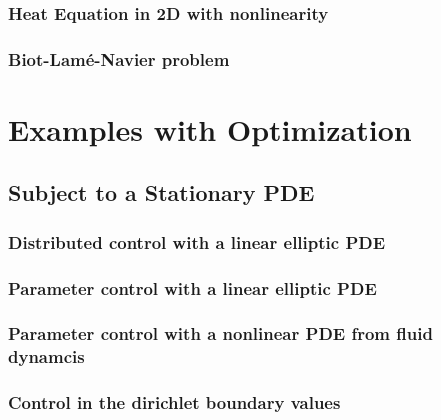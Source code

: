 \documentclass[a4paper,cleardoubleempty]{scrreprt}
\theoremstyle{plain}
\theoremstyle{remark}
\begin{document}
\subsection{Heat Equation in 2D with nonlinearity}
\label{PDE_Instat_Heat_2D}

\clearpage
\subsection{Biot-Lam\'e-Navier problem}
\label{PDE_Instat_biot_lame_navier}

\cleardoublepage
\chapter{Examples with Optimization}
\label{OPT}
\section{Subject to a Stationary PDE}
\label{OPT_Stat}
\subsection{Distributed control with a linear elliptic PDE}
\label{OPT_Stat_Distrib_Lin_Ellipt}

\clearpage
\subsection{Parameter control with a linear elliptic PDE}
\label{OPT_Stat_Param_Lin_Ellipt}

\clearpage
\subsection{Parameter control with a nonlinear PDE from fluid dynamcis}
\label{OPT_Stat_Param_Nonlin_Fluid}

\clearpage
\subsection{Control in the dirichlet boundary values}
\label{OPT_Stat_Dirichlet_Boundary}

\clearpage
\end{document}
